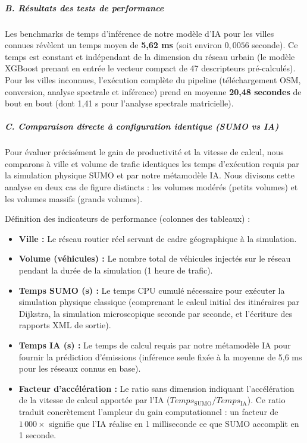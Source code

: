 \documentclass[10pt, a4paper]{article}
\providecommand{\tightlist}{}
\begin{document}
\subparagraph{B. Résultats des tests de
performance}\label{b.-ruxe9sultats-des-tests-de-performance}

Les benchmarks de temps d'inférence de notre modèle d'IA pour les villes
connues révèlent un temps moyen de \textbf{5,62 ms} (soit environ
\(0,0056\) seconde). Ce temps est constant et indépendant de la
dimension du réseau urbain (le modèle XGBoost prenant en entrée le
vecteur compact de 47 descripteurs pré-calculés). Pour les villes
inconnues, l'exécution complète du pipeline (téléchargement OSM,
conversion, analyse spectrale et inférence) prend en moyenne
\textbf{20,48 secondes} de bout en bout (dont 1,41 s pour l'analyse
spectrale matricielle).

\subparagraph{C. Comparaison directe à configuration identique (SUMO vs
IA)}\label{c.-comparaison-directe-uxe0-configuration-identique-sumo-vs-ia}

Pour évaluer précisément le gain de productivité et la vitesse de
calcul, nous comparons à ville et volume de trafic identiques les temps
d'exécution requis par la simulation physique SUMO et par notre
métamodèle IA. Nous divisons cette analyse en deux cas de figure
distincts : les volumes modérés (petits volumes) et les volumes massifs
(grands volumes).

Définition des indicateurs de performance (colonnes des tableaux) :

\begin{itemize}
\tightlist
\item
  \textbf{Ville :} Le réseau routier réel servant de cadre géographique
  à la simulation.
\item
  \textbf{Volume (véhicules) :} Le nombre total de véhicules injectés
  sur le réseau pendant la durée de la simulation (1 heure de trafic).
\item
  \textbf{Temps SUMO (s) :} Le temps CPU cumulé nécessaire pour exécuter
  la simulation physique classique (comprenant le calcul initial des
  itinéraires par Dijkstra, la simulation microscopique seconde par
  seconde, et l'écriture des rapports XML de sortie).
\item
  \textbf{Temps IA (s) :} Le temps de calcul requis par notre métamodèle
  IA pour fournir la prédiction d'émissions (inférence seule fixée à la
  moyenne de 5,6 ms pour les réseaux connus en base).
\item
  \textbf{Facteur d'accélération :} Le ratio sans dimension indiquant
  l'accélération de la vitesse de calcul apportée par l'IA
  (\(Temps_{\text{SUMO}} / Temps_{\text{IA}}\)). Ce ratio traduit
  concrètement l'ampleur du gain computationnel : un facteur de
  \(1\,000\times\) signifie que l'IA réalise en 1 milliseconde ce que
  SUMO accomplit en 1 seconde.
\end{itemize}
\end{document}
